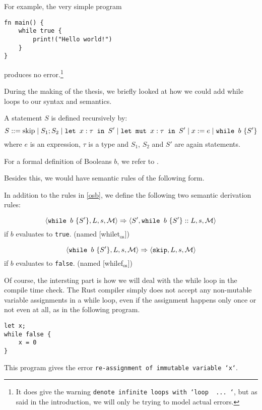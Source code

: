 For example, the very simple program 

\begin{verbatim}
fn main() {
    while true {
        print!("Hello world!")
    }
}
\end{verbatim}

produces no error.\footnote{It does give the warning \texttt{denote infinite loops with `loop { ... }`}, but as said in the introduction, we will only be trying to model actual errors.}

During the making of the thesis, we briefly looked at how we could add while loops to our syntax and semantics. 

\begin{definition}
\label{statementswhile}
A statement $S$ is defined recursively by:
$$S ::= \textrm{skip} \mid S_1; S_2 \mid \texttt{let }x : \tau \texttt{ in } S' \mid \texttt{let mut }x : \tau \texttt{ in } S' \mid x := e \mid \texttt{while } b~ \{ S' \}$$
where $e$ is an expression, $\tau$ is a type and $S_1$, $S_2$ and $S'$ are again statements.
\end{definition}

For a formal definition of Booleans $b$, we refer to \cite{nielson1992semantics}.

Besides this, we would have semantic rules of the following form. 

\begin{definition}
\label{oswhile}
In addition to the rules in \ref{osb}, we define the following two semantic derivation rules:

$$\langle \texttt{while } b~ \{ S' \}, L, s, \mathcal{M} \rangle \Rightarrow \langle S', \texttt{while } b~ \{ S' \}::L, s, \mathcal{M} \rangle$$ 
if $b$ evaluates to \texttt{true}. (named [whilet$_{\textrm{os}}$])

$$\langle \texttt{while } b~ \{ S' \}, L, s, \mathcal{M} \rangle \Rightarrow \langle \texttt{skip}, L, s, \mathcal{M} \rangle$$ 
if $b$ evaluates to \texttt{false}. (named [whilef$_{\textrm{os}}$])
\end{definition}

Of course, the intersting part is how we will deal with the while loop in the compile time check. The Rust compiler simply does not accept any non-mutable variable assignments in a while loop, even if the assignment happens only once or not even at all, as in the following program.

\begin{verbatim}
let x;
while false {
    x = 0
}
\end{verbatim}

This program gives the error \texttt{re-assignment of immutable variable `x`}.

